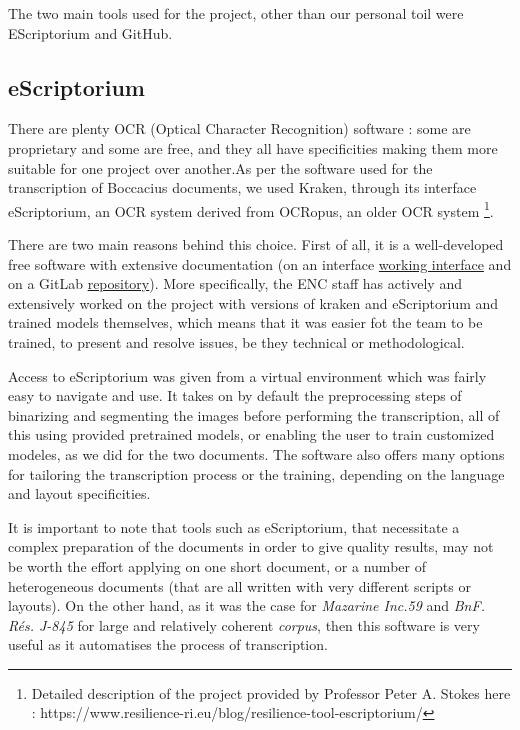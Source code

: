 \documentclass[12pt,twoside]{article}
\begin{document}
The two main tools used for the project, other than our personal toil were EScriptorium and GitHub.

\subsection{eScriptorium}
There are plenty OCR (Optical Character Recognition) software : some are proprietary and some are free, and they all have specificities making them more suitable for one project over another.As per the software used for the transcription of Boccacius documents, we used Kraken, through its interface eScriptorium, an OCR system derived from OCRopus, an older OCR system \footnote{Detailed description of the project provided by Professor Peter A. Stokes here : https://www.resilience-ri.eu/blog/resilience-tool-escriptorium/}.

There are two main reasons behind this choice. First of all, it is a well-developed free software with extensive documentation (on an interface \href{https://traces6.paris.inria.fr/}{working interface} and on a GitLab \href{https://gitlab.com/scripta/escriptorium/}{repository}). More specifically, the ENC staff has actively and extensively worked on the project with versions of kraken and eScriptorium and trained models themselves, which means that it was easier fot the team to be trained, to present and resolve issues, be they technical or methodological.

Access to eScriptorium was given from a virtual environment which was fairly easy to navigate and use. It takes on by default the preprocessing steps of binarizing and segmenting the images before performing the transcription, all of this using provided pretrained models, or enabling the user to train customized modeles, as we did for the two documents. The software also offers many options for tailoring the transcription process or the training, depending on the language and layout specificities. 

It is important to note that tools such as eScriptorium, that necessitate a complex preparation of the documents in order to give quality results, may not be worth the effort  applying on one short document, or a number of heterogeneous documents (that are all written with very different scripts or layouts). On the other hand, as it was the case for \textit{Mazarine Inc.59} and \textit{BnF. Rés. J-845} for large and relatively coherent \textit{corpus}, then this software is very useful as it  automatises the process of transcription.
\end{document}
